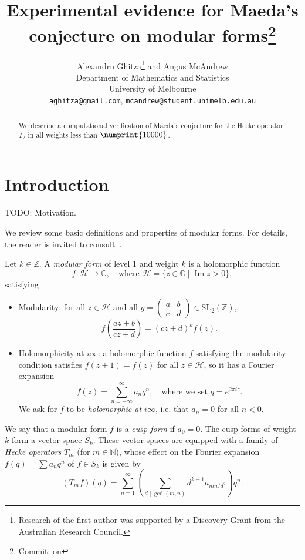 \documentclass[11pt]{article}
\title{Experimental evidence for Maeda's conjecture on modular forms\footnote{Commit: \gitAbbrevHash{} on \printdate{\gitAuthorDate{}}}
}
\author{
Alexandru Ghitza\footnote{Research of the first author was supported by 
a Discovery Grant from the Australian Research Council.}  
{} and 
Angus McAndrew\\
Department of Mathematics and Statistics\\
University of Melbourne\\
{\tt aghitza@gmail.com}, {\tt mcandrew@student.unimelb.edu.au}
}
\date{}
\theoremstyle{plain}
\theoremstyle{definition}
\theoremstyle{remark}
\numberwithin{equation}{section}
\numberwithin{table}{section}
\newcommand{\longto}{\longrightarrow}
\newcommand{\CC}{\mathbb{C}}
\newcommand{\ZZ}{\mathbb{Z}}
\newcommand{\NN}{\mathbb{N}}
\newcommand{\cH}{\mathcal{H}}
\renewcommand{\Im}{\operatorname{Im}}
\newcommand{\bound}{\numprint{10000}}
\newcommand{\SL}{\mathrm{SL}}
\begin{document}
\thispagestyle{empty}

\maketitle
\begin{abstract}
  We describe a computational verification of Maeda's conjecture for the Hecke
  operator $T_2$ in all weights less than $\bound$.
\end{abstract}


\section{Introduction}

TODO: Motivation.

We review some basic definitions and properties of modular forms.  For
details, the reader is invited to consult~\cite{Stein}.

Let $k\in\ZZ$.  A \emph{modular form} of level $1$ and weight $k$ is a
holomorphic function
\begin{equation*}
  f\colon\cH\longto\CC, \quad\text{where }
  \cH=\{z\in\CC\mid \Im z>0\},
\end{equation*}
satisfying
\begin{itemize}
  \item Modularity: for all $z\in\cH$ and all
    $g=\left(\begin{smallmatrix}a&b\\c&d\end{smallmatrix}\right)\in\SL_2(\ZZ)$,
      \begin{equation*}
        f\left(\frac{az+b}{cz+d}\right)=(cz+d)^kf(z).
      \end{equation*}
  \item Holomorphicity at $i\infty$: a holomorphic function $f$ satisfying the
    modularity condition satisfies $f(z+1)=f(z)$ for all $z\in\cH$, so it has
    a Fourier expansion
    \begin{equation*}
      f(z)=\sum_{n=-\infty}^\infty a_nq^n,\quad\text{where we set }
      q=e^{2\pi i z}.
    \end{equation*}
    We ask for $f$ to be \emph{holomorphic at $i\infty$}, i.e. that $a_n=0$
    for all $n<0$.
\end{itemize}

We say that a modular form $f$ is a \emph{cusp form} if $a_0=0$.  The cusp
forms of weight $k$ form a vector space $S_k$.  These vector spaces are
equipped with a family of \emph{Hecke operators} $T_m$ (for $m\in\NN$), whose
effect on the Fourier expansion $f(q)=\sum a_nq^n$ of $f\in S_k$ is given by
\begin{equation*}
  (T_m f)(q)=\sum_{n=1}^\infty \left(\sum_{d\mid\gcd(m,n)}d^{k-1}a_{mn/d^2}\right)q^n.
\end{equation*}
\end{document}
